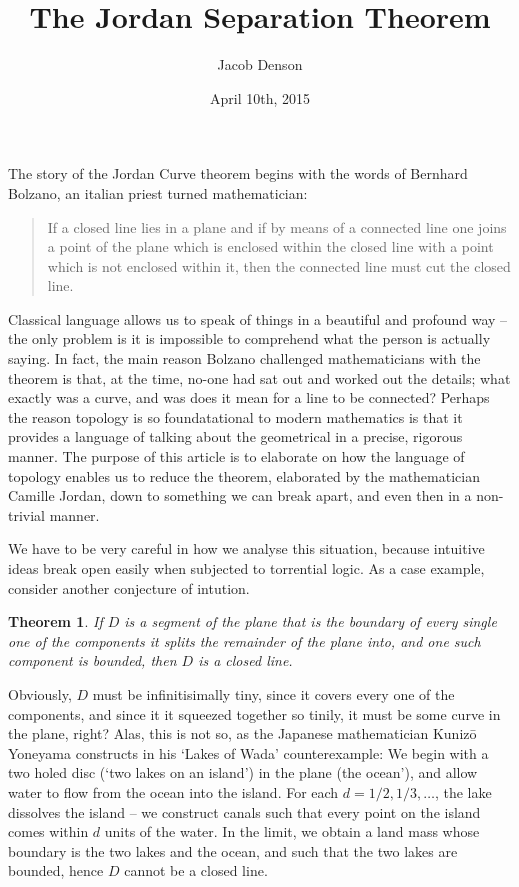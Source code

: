 \documentclass{article}
\title{The Jordan Separation Theorem}
\author{Jacob Denson}
\date{April 10th, 2015}
\newtheorem{theorem}{Theorem}
\begin{document}
\maketitle

The story of the Jordan Curve theorem begins with the words of Bernhard Bolzano, an italian priest turned mathematician:
%
\begin{quote}
    If a closed line lies in a plane and if by means of a connected line one joins a point of the plane which is enclosed within the closed line with a point which is not enclosed within it, then the connected line must cut the closed line.
\end{quote}
%
Classical language allows us to speak of things in a beautiful and profound way -- the only problem is it is impossible to comprehend what the person is actually saying. In fact, the main reason Bolzano challenged mathematicians with the theorem is that, at the time, no-one had sat out and worked out the details; what exactly was a curve, and was does it mean for a line to be connected? Perhaps the reason topology is so foundatational to modern mathematics is that it provides a language of talking about the geometrical in a precise, rigorous manner. The purpose of this article is to elaborate on how the language of topology enables us to reduce the theorem, elaborated by the mathematician Camille Jordan, down to something we can break apart, and even then in a non-trivial manner.

We have to be very careful in how we analyse this situation, because intuitive ideas break open easily when subjected to torrential logic. As a case example, consider another conjecture of intution.
%
\begin{theorem}
    If $D$ is a segment of the plane that is the boundary of every single one of the components it splits the remainder of the plane into, and one such component is bounded, then $D$ is a closed line.
\end{theorem}
%
Obviously, $D$ must be infinitisimally tiny, since it covers every one of the components, and since it it squeezed together so tinily, it must be some curve in the plane, right? Alas, this is not so, as the Japanese mathematician Kunizō Yoneyama constructs in his `Lakes of Wada' counterexample: We begin with a two holed disc (`two lakes on an island') in the plane (the ocean'), and allow water to flow from the ocean into the island. For each $d = 1/2, 1/3, \dots$, the lake dissolves the island -- we construct canals such that every point on the island comes within $d$ units of the water. In the limit, we obtain a land mass whose boundary is the two lakes and the ocean, and such that the two lakes are bounded, hence $D$ cannot be a closed line.
\end{document}
